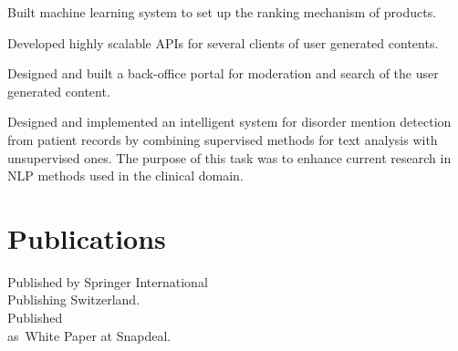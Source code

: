 \documentclass[]{rajnikant-resume-openfont}
\begin{document}
\begin{minipage}[t]{0.66\textwidth}
\begin{tightemize}
\end{tightemize}
\sectionsep


\begin{tightemize}
\item Built machine learning system to set up the ranking mechanism of products. 
\item Developed highly scalable APIs for several clients of user generated contents.
\item Designed and built a back-office portal for moderation  and search of the user generated content.
\end{tightemize}
\sectionsep

\begin{tightemize}
\item  {} Designed and implemented an intelligent system for disorder mention detection from
patient records by combining supervised methods for text analysis with unsupervised ones. The purpose of this
task was to enhance current research in NLP methods used in the clinical domain.
\end{tightemize}




\section{Publications}
\textbullet{}  \href{https://rd.springer.com/chapter/10.1007/978-3-319-32467-8_118}{ } Published by Springer International \\ \hspace{9pt}Publishing Switzerland. \\
\textbullet{}   Published \\ \hspace{8pt} as White Paper at Snapdeal.
\sectionsep


\end{minipage}
\end{document}
